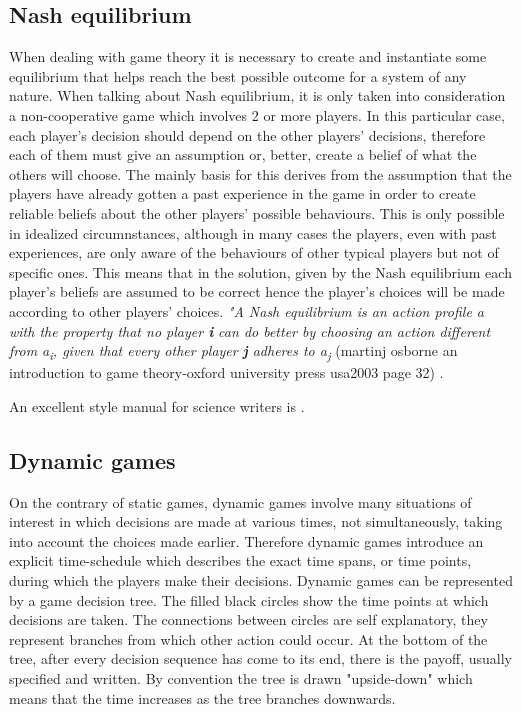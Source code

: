 \documentclass[conference]{IEEEtran}
\begin{document}
\subsection{Nash equilibrium}
When dealing with game theory it is necessary to create and instantiate some equilibrium that helps reach the best possible outcome for a system of any nature. When talking about Nash equilibrium, it is only taken into consideration a non-cooperative game which involves 2 or more players. In this particular case, each player's decision should depend on the other players' decisions, therefore each of them must give an assumption or, better, create a belief of what the others will choose. The mainly basis for this derives from the assumption that the players have already gotten a past experience in the game in order to create reliable beliefs about the other players' possible behaviours.
This is only possible in idealized circumnstances, although in many cases the players, even with past experiences, are only aware of the behaviours of other typical players but not of specific ones. This means that in the solution, given by the Nash equilibrium each player's beliefs are assumed to be correct hence the player's choices will be made according to other players' choices. 
\textit{"A Nash equilibrium is an action profile a\textsuperscript{\text{*}} with the property that no player \textbf{i} can do better by choosing an action different from a\textsuperscript{\text{*}}\textsubscript{i}, given that every other player \textbf{j} adheres to a\textsuperscript{\text{*}}\textsubscript{j} }
(martinj osborne an introduction to game theory-oxford university press usa2003 page 32) .

An excellent style manual for science writers is \cite{b7}.

\subsection{Dynamic games}
On the contrary of static games, dynamic games involve many situations of interest in which decisions are
made at various times, not simultaneously, taking into account the choices made earlier. Therefore dynamic games introduce an explicit time-schedule which describes the exact time spans, or time points, during which the players make their decisions.
Dynamic games can be represented by a game decision tree. The filled black circles show the time points at which decisions are taken. The connections between circles are self explanatory, they represent branches from which other action could occur. At the bottom of the tree, after every decision sequence has come to its end, there is the payoff, usually specified and written. By convention the tree is drawn "upside-down" which means that the time increases as the tree branches downwards.
\end{document}
